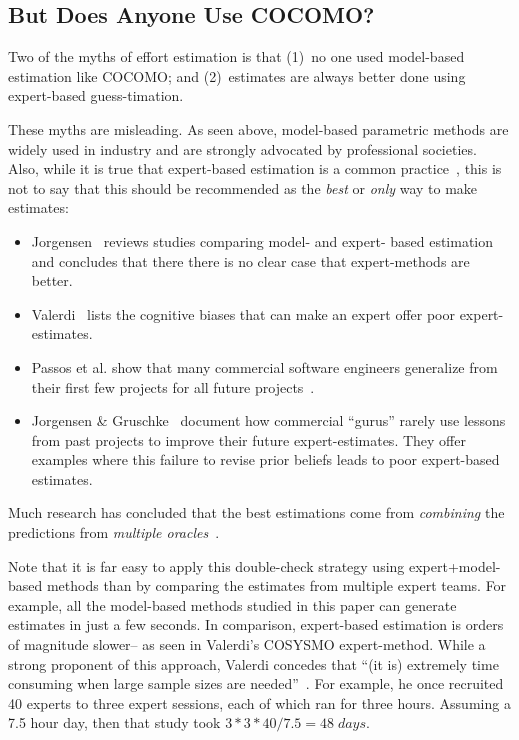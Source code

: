 \documentclass[smallcondesed]{svjour3}
\newcommand{\bi}{\begin{itemize}[leftmargin=0.4cm]}
\newcommand{\ei}{\end{itemize}}
\begin{document}
\subsection{But Does Anyone Use COCOMO?}

 


Two of the myths of effort estimation is that 
(1)~no one used model-based estimation like COCOMO;
and (2)~estimates are always better done using expert-based guess-timation.

These myths are misleading.
As seen above,  model-based
parametric methods are  widely used in industry and
are strongly advocated by professional societies.
Also, 
while it is true that expert-based estimation is a common practice~\cite{boehm00a}, this is not to say that this should be recommended as the {\em best} or {\em only} way to make estimates:
\bi 
\item
Jorgensen~\cite{Jorgensen2004} reviews studies 
comparing  model- and expert- based estimation and concludes that there
there is no clear case that expert-methods are better.
\item 
Valerdi~\cite{valerdi11} lists the
cognitive biases that can make an expert offer poor expert-estimates.
\item Passos et al. show that many
commercial software engineers generalize from their
first few projects for all future
projects~\cite{passos11}.
\item
Jorgensen \& Gruschke~\cite{jorgensen09} document how
  commercial  ``gurus'' rarely use lessons
  from past projects to improve their future expert-estimates. 
 They offer examples where this
  failure to revise prior beliefs   leads to poor
 expert-based estimates.
  \ei 
Much research has concluded that the best estimations come from {\em combining} the predictions
from {\em multiple oracles}~\cite{koc11a,chulani99,baker07,valerdi11}.  

Note that it is far easy to apply this double-check strategy using expert+model-based methods 
than by comparing the estimates from multiple expert teams.
For example, all the model-based methods  studied in this paper can generate estimates
in just a few seconds. In comparison, expert-based estimation is orders of magnitude slower-- as seen in  
Valerdi's  
COSYSMO expert-method.
While a strong proponent of this approach, Valerdi concedes that 
``(it is)  extremely time
consuming when large sample sizes are needed''~\cite{valerdi11}.
For example, he once
recruited 40 experts to three expert sessions, each of which ran for three hours.
Assuming a 7.5 hour day,
then that study took $3*3*40 /7.5 = 48\; \mathit{days}$.
\end{document}
